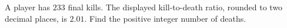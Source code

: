 A player has $233$ final kills. The displayed kill-to-death ratio, rounded to two decimal places, is $2.01$. Find the positive integer number of deaths.
